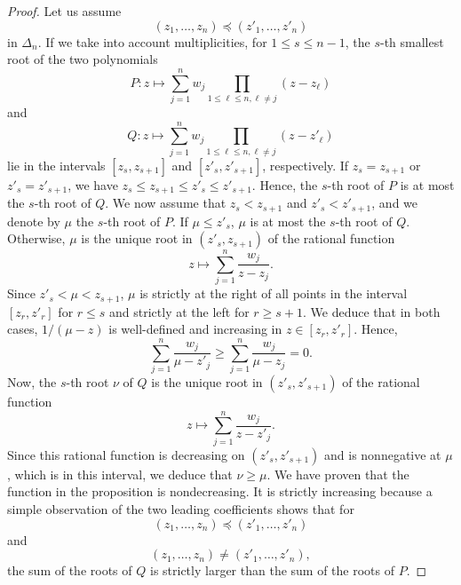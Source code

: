 \documentclass[11pt]{amsart}
\begin{document}
\begin{proof}
Let us assume 
$$(z_1, \dots, z_n) \preccurlyeq (z'_1, \dots, z'_n)$$
in $\Delta_n$. 
If we take into account multiplicities, for $1 \leq s \leq n-1$, the $s$-th smallest root of the two polynomials 
$$P : z \mapsto \sum_{j=1}^n w_j \prod_{1 \leq \ell \leq n, \ell \neq j} (z - z_\ell)$$ 
and 
$$Q : z \mapsto \sum_{j=1}^n w_j \prod_{1 \leq \ell \leq n, \ell \neq j} (z - z'_\ell)$$ 
lie in the intervals $[z_s, z_{s+1}]$ and $[z'_s, z'_{s+1}]$, respectively. If $z_s = z_{s+1}$ or 
$z'_s = z'_{s+1}$, we have $z_s \leq z_{s+1} \leq z'_s \leq z'_{s+1}$. Hence, the $s$-th root of $P$ is at most 
the $s$-th root of $Q$. We now assume that $z_s < z_{s+1}$
and $z'_s < z'_{s+1}$, and we denote by $\mu$ the $s$-th root of $P$. If $\mu \leq z'_s$, $\mu$ is at most the $s$-th root of $Q$.
Otherwise, $\mu$ is the unique root in $(z'_s, z_{s+1})$
of the rational function 
$$z \mapsto \sum_{j=1}^n \frac{w_j}{z - z_j}.$$
Since $z'_s < \mu < z_{s+1}$, $\mu$ is strictly at the right 
of all points in the interval $[z_r, z'_r]$ for $r \leq s$ and strictly 
at the left for $r \geq s+1$. We deduce that in both cases,
$1/(\mu - z)$ is well-defined and increasing in $z \in [z_r, z'_r]$. Hence, 
$$ \sum_{j = 1}^n \frac{w_j}{ \mu - z'_j} \geq
\sum_{j = 1}^n \frac{w_j}{ \mu - z_j}  = 0.$$
Now, the $s$-th root $\nu$ of $Q$ is the unique root
in $(z'_s , z'_{s+1})$ of the rational function
$$z \mapsto \sum_{j=1}^n \frac{w_j}{z - z'_j}.$$
Since this rational function is decreasing on $(z'_s , z'_{s+1})$ and is nonnegative at $\mu$, which is in this interval, 
we deduce that $\nu \geq \mu$. 
We have proven that the function in the proposition is nondecreasing. 
It is strictly increasing because a simple observation of the two leading coefficients shows that for 
 $$(z_1, \dots, z_n) \preccurlyeq (z'_1, \dots, z'_n)$$ 
 and 
 $$(z_1, \dots, z_n) \neq (z'_1, \dots, z'_n),$$
the sum of the roots of $Q$ is strictly larger than the sum of the roots of $P$. 


\end{proof}
\end{document}
